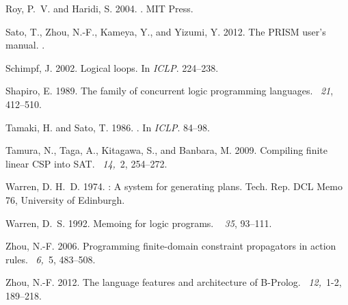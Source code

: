 \documentclass{new_tlp}
\begin{document}
\begin{thebibliography}{}
{\sc Roy, P.~V.} {\sc and} {\sc Haridi, S.} 2004.
.
\newblock MIT Press.

{\sc Sato, T.}, {\sc Zhou, N.-F.}, {\sc Kameya, Y.}, {\sc and} {\sc Yizumi, Y.}
  2012.
\newblock The {PRISM} user's manual.
.

{\sc Schimpf, J.} 2002.
\newblock Logical loops.
\newblock In {\em {ICLP}}. 224--238.

{\sc Shapiro, E.} 1989.
\newblock The family of concurrent logic programming languages.
~{\em 21}, 412--510.

{\sc Tamaki, H.} {\sc and} {\sc Sato, T.} 1986.
.
\newblock In {\em {ICLP}}. 84--98.

{\sc Tamura, N.}, {\sc Taga, A.}, {\sc Kitagawa, S.}, {\sc and} {\sc Banbara,
  M.} 2009.
\newblock Compiling finite linear {CSP} into {SAT}.
~{\em 14,\/}~2, 254--272.

{\sc Warren, D. H.~D.} 1974.
: A system for generating plans.
\newblock Tech. Rep. DCL Memo 76, University of Edinburgh.

{\sc Warren, D.~S.} 1992.
\newblock Memoing for logic programs.
~{\em
  35}, 93--111.

{\sc Zhou, N.-F.} 2006.
\newblock Programming finite-domain constraint propagators in action rules.
~{\em 6,\/}~5, 483--508.

{\sc Zhou, N.-F.} 2012.
\newblock The language features and architecture of {B-Prolog}.
~{\em 12,\/}~1-2,
  189--218.


\end{thebibliography}
\end{document}
